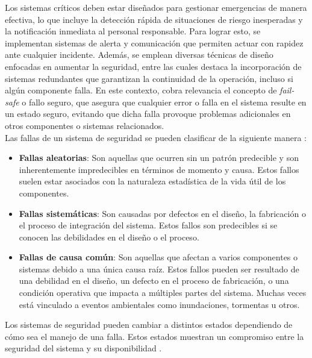 Los sistemas críticos deben estar diseñados para gestionar emergencias de manera efectiva, lo que incluye la detección rápida de situaciones de riesgo inesperadas y la notificación inmediata al personal responsable. Para lograr esto, se implementan sistemas de alerta y comunicación que permiten actuar con rapidez ante cualquier incidente. Además, se emplean diversas técnicas de diseño enfocadas en aumentar la seguridad, entre las cuales destaca la incorporación de sistemas redundantes que garantizan la continuidad de la operación, incluso si algún componente falla. En este contexto, cobra relevancia el concepto de \textit{fail-safe} o fallo seguro, que asegura que cualquier error o falla en el sistema resulte en un estado seguro, evitando que dicha falla provoque problemas adicionales en otros componentes o sistemas relacionados. \\


Las fallas de un sistema de seguridad se pueden clasificar de la siguiente manera \cite{clasificacion_fallas}: 
\begin{itemize}
    \item \textbf{Fallas aleatorias}: Son aquellas que ocurren sin un patrón predecible y son inherentemente impredecibles en términos de momento y causa. Estos fallos suelen estar asociados con la naturaleza estadística de la vida útil de los componentes.
    \item \textbf{Fallas sistemáticas}: Son causadas por defectos en el diseño, la fabricación o el proceso de integración del sistema. Estos fallos son predecibles si se conocen las debilidades en el diseño o el proceso.
    \item \textbf{Fallas de causa común}: Son aquellas que afectan a varios componentes o sistemas debido a una única causa raíz. Estos fallos pueden ser resultado de una debilidad en el diseño, un defecto en el proceso de fabricación, o una condición operativa que impacta a múltiples partes del sistema. Muchas veces está vinculado a eventos ambientales como inundaciones, tormentas u otros. 
\end{itemize}

Los sistemas de seguridad pueden cambiar a distintos estados dependiendo de cómo sea el manejo de una falla. Estos estados muestran un compromiso entre la seguridad del sistema y su disponibilidad \cite{norma_61508}. 

